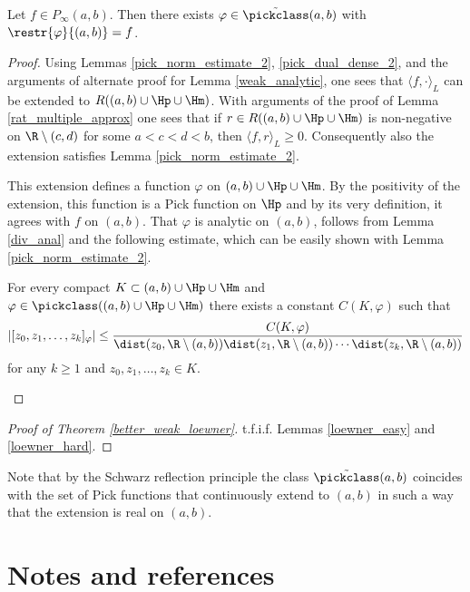 \begin{lem}\label{loewner_hard}
	Let $f \in P_{\infty}(a, b)$. Then there exists $\varphi \in \tilde{\pickclass}(a, b)$ with $\restr{\varphi}{(a, b)} = f$.
\end{lem}
\begin{proof}
	Using Lemmas \ref{pick_norm_estimate_2}, \ref{pick_dual_dense_2}, and the arguments of alternate proof for Lemma \ref{weak_analytic}, one sees that $\langle f, \cdot\rangle_{L}$ can be extended to $R((a, b) \cup \Hp \cup \Hm)$. With arguments of the proof of Lemma \ref{rat_multiple_approx} one sees that if $r \in R((a, b) \cup \Hp \cup \Hm)$ is non-negative on $\R \setminus (c, d)$ for some $a < c < d < b$, then $\langle f, r \rangle_{L} \geq 0$. Consequently also the extension satisfies Lemma \ref{pick_norm_estimate_2}.

	This extension defines a function $\varphi$ on $(a, b) \cup \Hp \cup \Hm$. By the positivity of the extension, this function is a Pick function on $\Hp$ and by its very definition, it agrees with $f$ on $(a, b)$. That $\varphi$ is analytic on $(a, b)$, follows from Lemma \ref{div_anal} and the following estimate, which can be easily shown with Lemma \ref{pick_norm_estimate_2}.
	\begin{lem}\label{pick_div_dif_estimate_2}
		For every compact $K \subset (a, b) \cup \Hp \cup \Hm$ and $\varphi \in \pickclass((a, b) \cup \Hp \cup \Hm)$ there exists a constant $C(K, \varphi)$ such that
		\begin{align*}
			\left|[z_{0}, z_{1}, \ldots, z_{k}]_{\varphi}\right| \leq \frac{C(K, \varphi)}{\dist(z_{0}, \R \setminus (a, b)) \dist(z_{1}, \R \setminus (a, b)) \cdots \dist(z_{k}, \R \setminus (a, b))}
		\end{align*}
		for any $k \geq 1$ and $z_{0}, z_{1}, \ldots, z_{k} \in K$.
	\end{lem}
\end{proof}

\begin{proof}[Proof of Theorem \ref{better_weak_loewner}]
	t.f.i.f. Lemmas \ref{loewner_easy} and \ref{loewner_hard}.
\end{proof}

Note that by the Schwarz reflection principle the class $\tilde{\pickclass}(a, b)$ coincides with the set of Pick functions that continuously extend to $(a, b)$ in such a way that the extension is real on $(a, b)$.

\section{Notes and references}

